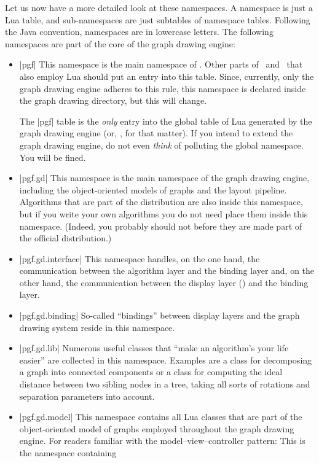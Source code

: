 Let us now have a more detailed look at these namespaces. A namespace
is just a Lua table, and sub-namespaces are just subtables of
namespace tables. Following the Java convention, namespaces are in
lowercase letters. The following namespaces are part of the core of
the graph drawing engine:
\begin{itemize}
\item |pgf| This namespace is the main namespace of \pgfname. Other
  parts of \pgfname\ and \tikzname\ that also employ Lua should put an
  entry into this table. Since, currently, only the graph drawing
  engine adheres to this rule, this namespace is declared inside the
  graph drawing directory, but this will change.

  The |pgf| table is the \emph{only} entry into the global table of
  Lua generated by the graph drawing engine (or, \pgfname, for that
  matter). If you intend to extend the graph drawing engine, do not
  even \emph{think} of polluting the global namespace. You will be
  fined.
\item |pgf.gd| This namespace is the main namespace of the graph drawing
  engine, including the object-oriented models of graphs and the
  layout pipeline. Algorithms that are part of the
  distribution are also inside this namespace, but if you write your
  own algorithms you do not need place them inside this
  namespace. (Indeed, you probably should not before they are made
  part of the official distribution.)
\item |pgf.gd.interface| This namespace handles, on the one hand, the
  communication between the algorithm layer and the binding layer and,
  on the other hand, the communication between the display layer
  (\tikzname) and the binding layer.
\item |pgf.gd.binding| So-called ``bindings'' between display layers
  and the graph drawing system reside in this namespace.
\item |pgf.gd.lib| Numerous useful classes that ``make an algorithm's
  your life easier'' are collected in this namespace. Examples are a
  class for decomposing a graph into connected components or a class
  for computing the ideal distance between two sibling nodes in a
  tree, taking all sorts of rotations and separation parameters into
  account. 
\item |pgf.gd.model| This namespace contains all Lua classes that are
  part of the object-oriented model of graphs employed
  throughout the graph drawing engine. For readers familiar with the
  model--view--controller pattern: This is the namespace containing

\end{itemize}
